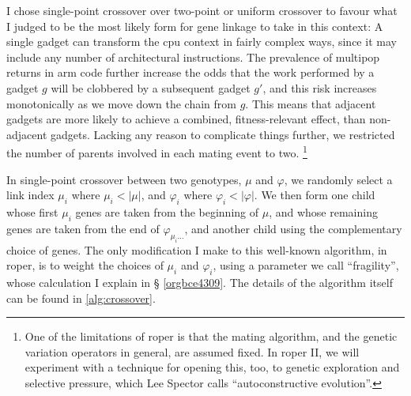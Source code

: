 \documentclass[12pt,glossary]{dalthesis}
\begin{document}
I chose single-point crossover over two-point or uniform crossover to favour
what I judged to be the most likely form for gene linkage to take in this
context: A single gadget can transform the \gls{cpu} context in fairly complex
ways, since it may include any number of architectural instructions. The
prevalence of multipop returns in \gls{arm} code further increase the odds that
the work performed by a gadget \(g\) will be clobbered by a subsequent gadget
\(g'\), and this risk increases monotonically as we move down the chain from \(g\).
This means that adjacent gadgets are more likely to achieve a combined,
fitness-relevant effect, than non-adjacent gadgets. Lacking any reason to
complicate things further, we restricted the number of parents involved in each
mating event to two. \footnote{One of the limitations of \gls{roper} is that the mating
algorithm, and the genetic variation operators in general, are assumed fixed. In
\gls{roper} II, we will experiment with a technique for opening this, too, to
genetic exploration and selective pressure, which Lee Spector calls
``autoconstructive evolution''.}


In single-point crossover between two genotypes, \(\mu\) and \(\varphi\), we
randomly select a link index \(\mu_i\) where \(\mu_i < |\mu|\), and \(\varphi_i\)
where \(\varphi_i < |\varphi|\). We then form one child whose first \(\mu_i\) genes
are taken from the beginning of \(\mu\), and whose remaining genes are taken from
the end of \(\varphi_{\mu_i\dots}\), and another child using the complementary
choice of genes. The only modification I make to this well-known algorithm, in
\gls{roper}, is to weight the choices of \(\mu_i\) and \(\varphi_i\), using a
parameter we call ``fragility'', whose calculation I explain in \S
\ref{orgbce4309}. The details of the algorithm itself can be found in
\ref{alg:crossover}.
\end{document}

